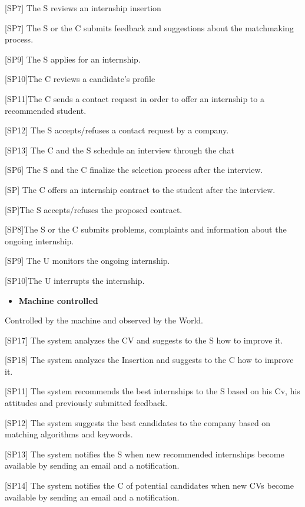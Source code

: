 {[}SP7{]} The S reviews an internship insertion

{[}SP7{]} The S or the C submits feedback and suggestions about the
matchmaking process.

{[}SP9{]} The S applies for an internship.

{[}SP10{]}The C reviews a candidate's profile

{[}SP11{]}The C sends a contact request in order to offer an internship
to a recommended student.

{[}SP12{]} The S accepts/refuses a contact request by a company.

{[}SP13{]} The C and the S schedule an interview through the chat

{[}SP6{]} The S and the C finalize the selection process after the
interview.~

{[}SP{]} The C offers an internship contract to the student after the
interview.

{[}SP{]}The S accepts/refuses the proposed contract.

{[}SP8{]}The S or the C submits problems, complaints and information
about the ongoing internship.~

{[}SP9{]} The U monitors the ongoing internship.

{[}SP10{]}The U interrupts the internship.

\begin{itemize}
\item
  \textbf{Machine controlled}
\end{itemize}

Controlled by the machine and observed by the World.

{[}SP17{]} The system analyzes the CV and suggests to the S how to
improve it.

{[}SP18{]} The system analyzes the Insertion and suggests to the C how
to improve it.

{[}SP11{]} The system recommends the best internships to the S based on
his Cv, his attitudes and previously submitted feedback.

{[}SP12{]} The system suggests the best candidates to the company based
on matching algorithms and keywords.

{[}SP13{]} The system notifies the S when new recommended internships
become available by sending an email and a notification.

{[}SP14{]} The system notifies the C of potential candidates when new
CVs become available by sending an email and a notification.

